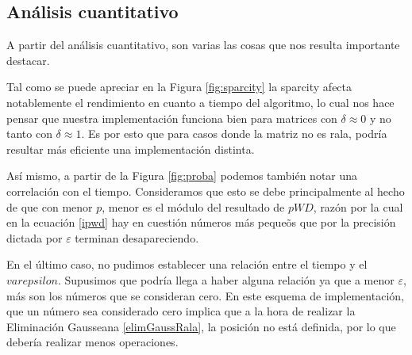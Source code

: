 \subsection*{An\'alisis cuantitativo}
\par A partir del an\'alisis cuantitativo, son varias las cosas que nos resulta importante destacar.
\par Tal como se puede apreciar en la Figura \ref{fig:sparcity} la sparcity afecta notablemente el rendimiento en cuanto a tiempo del algoritmo,
lo cual nos hace pensar que nuestra implementaci\'on funciona bien para matrices con $\delta \approx 0$ y no tanto con $\delta \approx 1$.
Es por esto que para casos donde la matriz no es rala, podr\'ia resultar m\'as eficiente una implementaci\'on distinta.
\par As\'i mismo, a partir de la Figura \ref{fig:proba} podemos tambi\'en notar una correlaci\'on con el tiempo. Consideramos que esto se debe
principalmente al hecho de que con menor $p$, menor es el m\'odulo del resultado de $pWD$, raz\'on por la cual en la ecuaci\'on \ref{ipwd} hay en
cuesti\'on n\'umeros m\'as peque\~os que por la precisi\'on dictada por $\varepsilon$ terminan desapareciendo.
\par En el \'ultimo caso, no pudimos establecer una relaci\'on entre el tiempo y el $varepsilon$. Supusimos que podr\'ia llega a haber alguna 
relaci\'on ya que a menor $\varepsilon$, m\'as son los n\'umeros que se consideran cero. En este esquema de implementaci\'on, que un n\'umero sea
considerado cero implica que a la hora de realizar la Eliminaci\'on Gausseana \ref{elimGaussRala}, la posici\'on no est\'a definida, por lo que 
deber\'ia realizar menos operaciones.